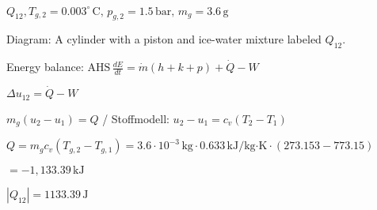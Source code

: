 \( Q_{12}, T_{g,2} = 0.003^\circ \, \text{C}, \, p_{g,2} = 1.5 \, \text{bar}, \, m_g = 3.6 \, \text{g} \)  

Diagram: A cylinder with a piston and ice-water mixture labeled \( Q_{12} \).  

Energy balance:  
\( \text{AHS} \, \frac{dE}{dt} = \dot{m}(h + k + p) + \dot{Q} - W \)  

\( \Delta u_{12} = \dot{Q} - W \)  

\( m_g (u_2 - u_1) = Q \) / Stoffmodell: \( u_2 - u_1 = c_v (T_2 - T_1) \)  

\( Q = m_g c_v (T_{g,2} - T_{g,1}) = 3.6 \cdot 10^{-3} \, \text{kg} \cdot 0.633 \, \text{kJ/kg·K} \cdot (273.153 - 773.15) \)  

\( = -1,133.39 \, \text{kJ} \)  

\( |Q_{12}| = 1133.39 \, \text{J} \)